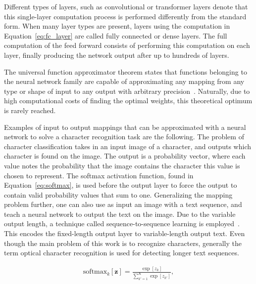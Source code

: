 \documentclass[english,twoside,openright]{UH_DS_MSc}
\begin{document}
Different types of layers, such as convolutional or transformer layers 
denote that this single-layer computation process is performed differently from 
the standard form. When many layer types are present, layers using the computation
in Equation~\ref{eq:fc_layer} are called fully connected or dense layers. The full computation of 
the feed forward consists of performing this computation on each layer, finally producing the 
network output after up to hundreds of layers.

The universal function approximator theorem states that functions belonging to the 
neural network family are capable of approximating any mapping from any type or shape of input
to any output with arbitrary precision~\cite{princebook}. Naturally, due to high computational 
costs of finding the optimal weights,
this theoretical optimum is rarely reached.

Examples of input to output mappings that can be approximated with a neural network to solve a character recognition task are the following. The problem of character classification takes in an input image of a character, and outputs which character is found on the image. The output is a probability vector, where each value notes the probability that the image contains the character this value is chosen to represent. The softmax activation function, found in Equation~\ref{eq:softmax}, is used before the output layer to force the output to contain valid probability values that sum to one. Generalizing the mapping problem further, one can also use as input an image 
with a text sequence, and teach a neural network to output the text on the image.
Due to the variable output length, a technique called sequence-to-sequence learning 
is employed~\cite{sutskever2014sequence}. This encodes the fixed-length output layer to variable-length 
output text. Even though the main problem of this work is to recognize characters, 
generally the term optical character recognition is used for detecting longer text sequences.

\begin{align}
    \text{softmax}_k[\mathbf{z}] = \frac{\exp[z_k]}{\sum_{k'=1}^{K} \exp[z_{k'}]},
    \label{eq:softmax}
\end{align}
\end{document}
